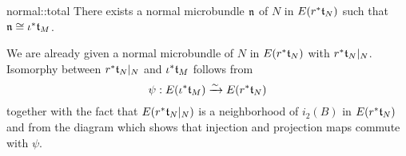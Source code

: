 \begin{mylemma}{normal::total}
    There exists a normal microbundle $\mathfrak{n}$ of $N$ in $E(r^*\mathfrak{t}_N)$ such that $\mathfrak{n} \cong \iota^*\mathfrak{t}_M$.
\end{mylemma}

\begin{myproof}
    We are already given a normal microbundle of $N$ in $E(r^*\mathfrak{t}_N)$ with $r^*\mathfrak{t}_N\vert_{N}$.
    Isomorphy between $r^*\mathfrak{t}_N\vert_{N}$ and $\iota^*\mathfrak{t}_M$ follows from
    \[ \psi: E(\iota^*\mathfrak{t}_M) \xrightarrow{\sim} E(r^*\mathfrak{t}_N) \]
    together with the fact that $E(r^*\mathfrak{t}_N\vert_{N})$ is a neighborhood of $i_2(B)$ in $E(r^*\mathfrak{t}_N)$
    and from the diagram which shows that injection and projection maps commute with $\psi$.
\end{myproof}